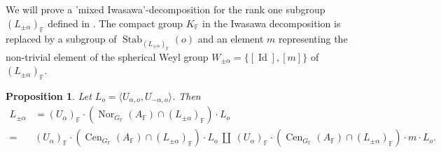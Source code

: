 \documentclass[12pt]{amsart}
\newcommand{\F}{\mathbb{F} }
\numberwithin{equation}{section}
\newtheorem{proposition}[theorem]{Proposition}
\theoremstyle{remark} %
\begin{document}
		We will prove a 'mixed Iwasawa'-decomposition for the rank one subgroup $(L_{\pm \alpha})_\F$ defined in \cite[Section \ref{I-sec:rank1}]{AppAGRCF}. The compact group $K_\F$ in the Iwasawa decomposition is replaced by a subgroup of $\operatorname{Stab}_{(L_{\pm \alpha})_\F}(o)$ and an element $m$ representing the non-trivial element of the spherical Weyl group $W_{\pm \alpha} = \{[\operatorname{Id}],[m]\}$ of $(L_{\pm \alpha})_\F$.
		\begin{proposition}\label{prop:BT_mixed_Iwasawa_rank_1}
			Let $L_o = \langle U_{\alpha,o} , U_{-\alpha, o} \rangle$. Then 
			\begin{align*}
				L_{\pm \alpha} &= (U_\alpha)_\F \cdot (\operatorname{Nor}_{G_\F}(A_\F) \cap (L_{\pm \alpha})_\F)\cdot L_o \\
				=\ & (U_\alpha)_\F \cdot (\operatorname{Cen}_{G_\F}(A_\F) \cap (L_{\pm \alpha})_\F)\cdot L_o  \ \amalg \ (U_\alpha)_\F \cdot (\operatorname{Cen}_{G_\F}(A_\F) \cap (L_{\pm \alpha})_\F)\cdot m \cdot L_o.
			\end{align*}
		\end{proposition}
\end{document}
